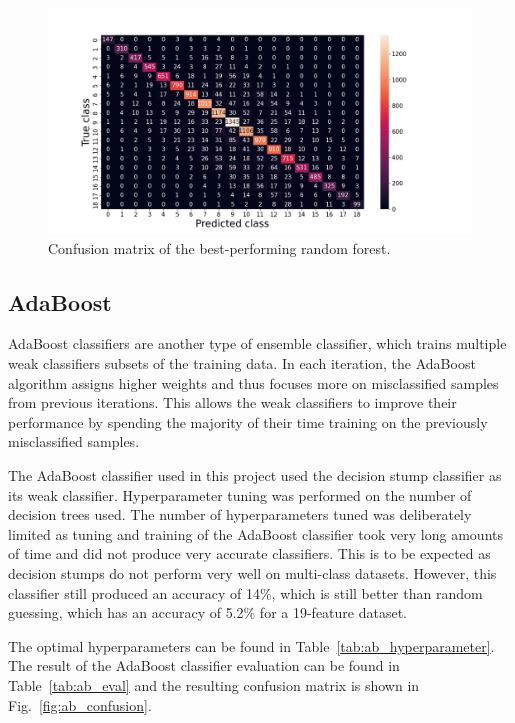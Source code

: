 \documentclass[11pt,a4paper]{article}
\begin{document}
\begin{figure}[htb]
    \centering
    \includegraphics[width=\columnwidth, keepaspectratio]{../confusion_Random Forest Classifier.png}
    \caption{Confusion matrix of the best-performing random forest.}\label{fig:rf_confusion}
\end{figure}

\clearpage
\subsection{AdaBoost}
AdaBoost classifiers are another type of ensemble classifier, which trains multiple weak classifiers subsets of the training data. In each iteration, the AdaBoost algorithm assigns higher weights and thus focuses more on misclassified samples from previous iterations. This allows the weak classifiers to improve their performance by spending the majority of their time training on the previously misclassified samples. 

The AdaBoost classifier used in this project used the decision stump classifier as its weak classifier. Hyperparameter tuning was performed on the number of decision trees used. The number of hyperparameters tuned was deliberately limited as tuning and training of the AdaBoost classifier took very long amounts of time and did not produce very accurate classifiers. This is to be expected as decision stumps do not perform very well on multi-class datasets. However, this classifier still produced an accuracy of 14\%, which is still better than random guessing, which has an accuracy of 5.2\% for a 19-feature dataset.

The optimal hyperparameters can be found in Table~\ref{tab:ab_hyperparameter}. The result of the AdaBoost classifier evaluation can be found in Table~\ref{tab:ab_eval} and the resulting confusion matrix is shown in Fig.~\ref{fig:ab_confusion}.
\end{document}
